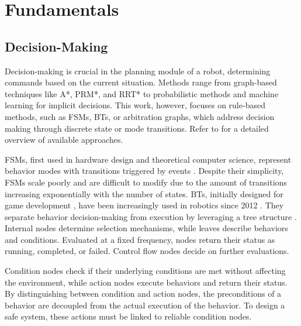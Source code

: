 
\section{Fundamentals}

\subsection{Decision-Making}

Decision-making is crucial in the planning module of a robot, determining commands based on the current situation.
Methods range from graph-based techniques like A*, PRM*, and RRT* to probabilistic methods and machine learning for implicit decisions.
This work, however, focuses on rule-based methods, such as \glspl{FSM}, \glspl{BT}, or arbitration graphs, which address decision making through discrete state or mode transitions.
Refer to \cite{schwartingPlanningDecisionMakingAutonomous2018,yurtseverSurveyAutonomousDriving2020,gammellAsymptoticallyOptimalSamplingBased2021}
for a detailed overview of available approaches.

\glspl{FSM}, first used in hardware design and theoretical computer science,
represent behavior modes with transitions triggered by events \cite{wagnerModelingSoftwareFinite2006,hopcroftIntroductionAutomataTheory2007}.
Despite their simplicity, \glspl{FSM} scale poorly and are difficult to modify due to the amount of transitions increasing exponentially with the number of states.
\glspl{BT}, initially designed for game development \cite{iovinoProgrammingEffortRequired2022},
have been increasingly used in robotics since 2012 \cite{bagnellIntegratedSystemAutonomous2012,ogrenIncreasingModularityUAV2012}.
They separate behavior decision-making from execution by leveraging a tree structure \cite{colledanchiseBehaviorTreesRobotics2018}.
Internal nodes determine selection mechanisms, while leaves describe behaviors and conditions.
Evaluated at a fixed frequency, nodes return their status as running, completed, or failed.
Control flow nodes decide on further evaluations.

Condition nodes check if their underlying conditions are met without affecting the environment, while action nodes execute behaviors and return their status.
By distinguishing between condition and action nodes, the preconditions of a behavior  are decoupled from the actual execution of the behavior.
To design a safe system, these actions must be linked to reliable condition nodes.

